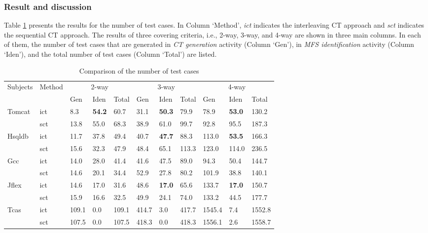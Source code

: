 \documentclass[10pt,journal,compsoc]{IEEEtran}
\begin{document}




\subsubsection{Result and discussion}
Table \ref{cm_elda_fglt_test} presents the results for the number of test cases. In Column `Method', \emph{ict} indicates the interleaving CT approach and \emph{sct} indicates the sequential CT approach. The results of three covering criteria, i.e., 2-way, 3-way, and 4-way are shown in three main columns. In each of them, the number of test cases that are generated in \emph{CT generation} activity (Column `Gen'), in \emph{MFS identification} activity (Column `Iden'), and the total number of test cases (Column `Total') are listed.

\begin{table}[ht]
\centering
\caption{Comparison of the number of test cases}
\label{cm_elda_fglt_test}
\begin{tabular}{|ll|lll|lll|lll|}
\hline
\multirow{2}{*}{Subjects} & \multirow{2}{*}{Method} & \multicolumn{3}{c|}{2-way} & \multicolumn{3}{c|}{3-way} & \multicolumn{3}{c|}{4-way} \\ \cline{3-11}
                          &                         &Gen  & Iden & Total  &  Gen  & Iden & Total  & Gen  & Iden & Total   \\ \hline
Tomcat	&ict	&8.3	&\textbf{54.2}	&60.7	&31.1	&\textbf{50.3}	&79.9	&78.9	&\textbf{53.0}	&130.2	\\
	&sct	&13.8	&55.0	&68.3	&38.9	&61.0	&99.7	&92.8	&95.5	&187.3	\\\hline
Hsqldb	&ict	&11.7	&37.8	&49.4	&40.7	&\textbf{47.7}	&88.3	&113.0	&\textbf{53.5}	&166.3	\\
	&sct	&15.6	&32.3	&47.9	&48.4	&65.1	&113.3	&123.0	&114.0	&236.5	\\\hline
Gcc	&ict	&14.0	&28.0	&41.4	&41.6	&47.5	&89.0	&94.3	&50.4	&144.7	\\
	&sct	&14.6	&20.1	&34.4	&52.9	&27.8	&80.2	&101.9	&38.8	&140.1	\\\hline
Jflex	&ict	&14.6	&17.0	&31.6	&48.6	&\textbf{17.0}	&65.6	&133.7	&\textbf{17.0}	&150.7	\\
	&sct	&15.9	&16.6	&32.5	&49.9	&24.1	&74.0	&133.2	&44.5	&177.7	\\\hline
Tcas	&ict	&109.1	&0.0	&109.1	&414.7	&3.0	&417.7	&1545.4	&7.4	&1552.8	\\
	&sct	&107.5	&0.0	&107.5	&418.3	&0.0	&418.3	&1556.1	&2.6	&1558.7	\\\hline
\end{tabular}
\end{table}
\end{document}
